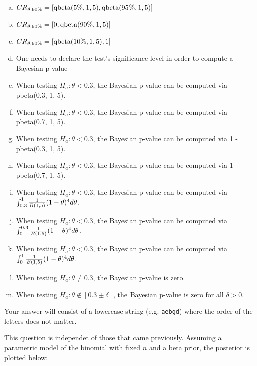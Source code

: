 \documentclass[12pt,landscape]{article}
\newcommand{\instr}{\small Your answer will consist of a lowercase string (e.g. \texttt{aebgd}) where the order of the letters does not matter. \normalsize}
\begin{document}
\begin{enumerate}[(a)]
\item $CR_{\theta, 90\%} = \left[\text{qbeta}(5\%, 1, 5), \text{qbeta}(95\%, 1, 5)\right]$
\item $CR_{\theta, 90\%} = \left[0, \text{qbeta}(90\%, 1, 5)\right]$
\item $CR_{\theta, 90\%} = \left[\text{qbeta}(10\%, 1, 5), 1\right]$
\item One needs to declare the test's significance level in order to compute a Bayesian p-value
\item When testing $H_a: \theta < 0.3$, the Bayesian p-value can be computed via pbeta(0.3, 1, 5).
\item When testing $H_a: \theta < 0.3$, the Bayesian p-value can be computed via pbeta(0.7, 1, 5).
\item When testing $H_a: \theta < 0.3$, the Bayesian p-value can be computed via 1 - pbeta(0.3, 1, 5).
\item When testing $H_a: \theta < 0.3$, the Bayesian p-value can be computed via 1 - pbeta(0.7, 1, 5).
\item When testing $H_a: \theta < 0.3$, the Bayesian p-value can be computed via $\int_{0.3}^1 \frac{1}{B(1,5)} (1-\theta)^4 d\theta$.
\item When testing $H_a: \theta < 0.3$, the Bayesian p-value can be computed via $\int_0^{0.3} \frac{1}{B(1,5)} (1-\theta)^4 d\theta$.
\item When testing $H_a: \theta < 0.3$, the Bayesian p-value can be computed via $\int_0^1 \frac{1}{B(1,5)} (1-\theta)^4 d\theta$.
\item When testing $H_a: \theta \neq 0.3$, the Bayesian p-value is zero.
\item When testing $H_a: \theta \notin [0.3 \pm \delta]$, the Bayesian p-value is zero for all $\delta > 0$.
\end{enumerate}
\eenum\instr\pagebreak


\problem{} This question is independet of those that came previously. Assuming a parametric model of the binomial with fixed $n$ and a beta prior, the posterior is plotted below:

%
%
\end{document}
